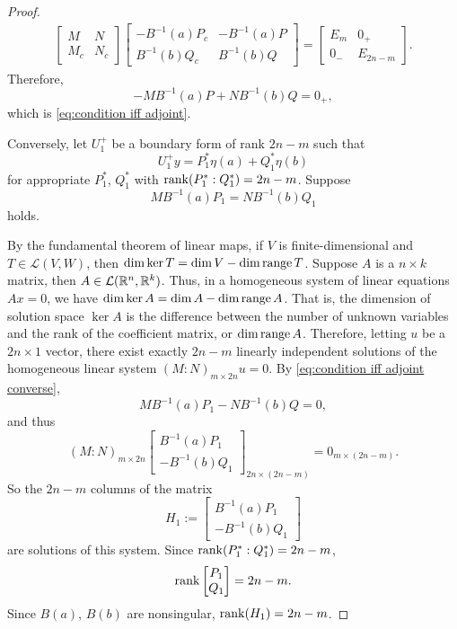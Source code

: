 \documentclass[11pt, oneside, a4paper]{article}
\begin{document}
\begin{proof}
    \begin{align*}
        \begin{bmatrix}
            M & N\\
            M_c & N_c
        \end{bmatrix}
        \begin{bmatrix}
            -B^{-1}(a)P_c & -B^{-1}(a)P\\
            B^{-1}(b)Q_c & B^{-1}(b)Q
        \end{bmatrix}
        =
        \begin{bmatrix}
            E_m & 0_+\\
            0_- & E_{2n-m}
        \end{bmatrix}.
    \end{align*}
    Therefore,
    \[-MB^{-1}(a)P + NB^{-1}(b)Q = 0_+,\]
    which is \eqref{eq:condition iff adjoint}.

    Conversely, let $U_1^+$ be a boundary form of rank $2n-m$ such that
    \[U_1^+y = P_1^*\eta(a) + Q_1^*\eta(b)\]
    for appropriate $P_1^*$, $Q_1^*$ with $\operatorname{rank}(P_1^*:Q_1^*)=2n-m$. Suppose
    \begin{equation}\label{eq:condition iff adjoint converse}
        MB^{-1}(a)P_1 = NB^{-1}(b)Q_1
    \end{equation}
    holds.

    By the fundamental theorem of linear maps\cite{Axler1997}, if $V$ is finite-dimensional and $T\in\mathcal{L}(V, W)$, then $\dim\ker T = \dim V - \dim \operatorname{range} T$. Suppose $A$ is a $n\times k$ matrix, then $A\in\mathcal{L}(\mathbb R^n, \mathbb R^k)$. Thus, in a homogeneous system of linear equations $Ax=0$, we have $\dim \ker A = \dim A - \dim \operatorname{range} A$. That is, the dimension of solution space $\ker A$ is the difference between the number of unknown variables and the rank of the coefficient matrix, or $\dim\operatorname{range} A$. Therefore, letting $u$ be a $2n\times 1$ vector, there exist exactly $2n-m$ linearly independent solutions of the homogeneous linear system $(M:N)_{m\times 2n}u=0$. By \eqref{eq:condition iff adjoint converse},
    \[MB^{-1}(a)P_1 - NB^{-1}(b)Q=0,\]
    and thus
    \[(M:N)_{m\times 2n}\begin{bmatrix}
        B^{-1}(a)P_1\\
        -B^{-1}(b)Q_1
    \end{bmatrix}_{2n\times (2n-m)} = 0_{m\times (2n-m)}.\]
    So the $2n-m$ columns of the matrix
    \[H_1:= \begin{bmatrix}
        B^{-1}(a)P_1\\
        -B^{-1}(b)Q_1
    \end{bmatrix}\]
    are solutions of this system. Since $\operatorname{rank}(P_1^*:Q_1^*)=2n-m$,
    \[\operatorname{rank}\begin{bmatrix}P_1\\ Q_1\end{bmatrix}=2n-m.\]
    Since $B(a)$, $B(b)$ are nonsingular, $\operatorname{rank}(H_1)=2n-m$.


\end{proof}
\end{document}

